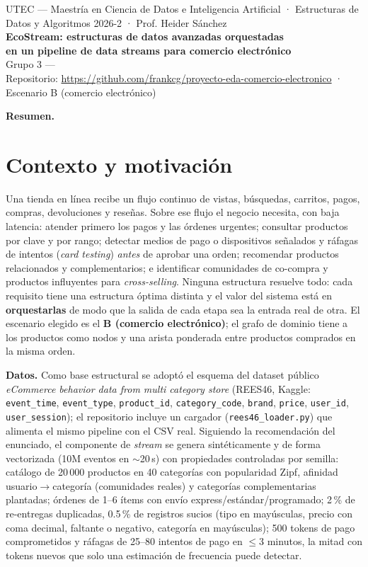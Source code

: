 \documentclass[10pt,a4paper]{article}
\begin{document}
\begin{center}
{\sffamily\small UTEC — Maestría en Ciencia de Datos e Inteligencia Artificial · Estructuras de Datos y Algoritmos 2026-2 · Prof. Heider Sánchez}\\[4pt]
{\LARGE\bfseries\sffamily EcoStream: estructuras de datos avanzadas orquestadas\\[2pt] en un pipeline de data streams para comercio electrónico}\\[5pt]
{\sffamily Grupo 3 — }\\[2pt]
{\small\sffamily Repositorio: \url{https://github.com/frankcg/proyecto-eda-comercio-electronico} · Escenario B (comercio electrónico)}
\end{center}

\noindent\colorbox{acc!8}{\parbox{\dimexpr\linewidth-2\fboxsep}{\small
\textbf{Resumen.} }}

\section{Contexto y motivación}
Una tienda en línea recibe un flujo continuo de vistas, búsquedas, carritos, pagos, compras, devoluciones y reseñas. Sobre ese flujo
el negocio necesita, con baja latencia: atender primero los pagos y las órdenes urgentes; consultar productos por clave y por rango;
detectar medios de pago o dispositivos señalados y ráfagas de intentos (\emph{card testing}) \emph{antes} de aprobar una orden;
recomendar productos relacionados y complementarios; e identificar comunidades de co-compra y productos influyentes para
\emph{cross-selling}. Ninguna estructura resuelve todo: cada requisito tiene una estructura óptima distinta y el valor del sistema
está en \textbf{orquestarlas} de modo que la salida de cada etapa sea la entrada real de otra. El escenario elegido es el
\textbf{B (comercio electrónico)}; el grafo de dominio tiene a los productos como nodos y una arista ponderada entre productos
comprados en la misma orden.

\textbf{Datos.} Como base estructural se adoptó el esquema del dataset público \emph{eCommerce behavior data from multi category store}
(REES46, Kaggle: \texttt{event\_time}, \texttt{event\_type}, \texttt{product\_id}, \texttt{category\_code}, \texttt{brand}, \texttt{price}, \texttt{user\_id}, \texttt{user\_session}); el repositorio incluye
un cargador (\texttt{rees46\_loader.py}) que alimenta el mismo pipeline con el CSV real. Siguiendo la recomendación del enunciado, el
componente de \emph{stream} se genera sintéticamente y de forma vectorizada (10M eventos en $\sim$20\,s) con propiedades controladas por semilla:
catálogo de 20\,000 productos en 40 categorías con popularidad Zipf, afinidad usuario$\to$categoría (comunidades reales) y categorías
complementarias plantadas; órdenes de 1–6 ítems con envío express/estándar/programado; 2\,\% de re-entregas duplicadas, 0.5\,\% de registros sucios
(tipo en mayúsculas, precio con coma decimal, faltante o negativo, categoría en mayúsculas); 500 tokens de pago comprometidos y ráfagas
de 25–80 intentos de pago en $\le$3 minutos, la mitad con tokens nuevos que solo una estimación de frecuencia puede detectar.
\end{document}
